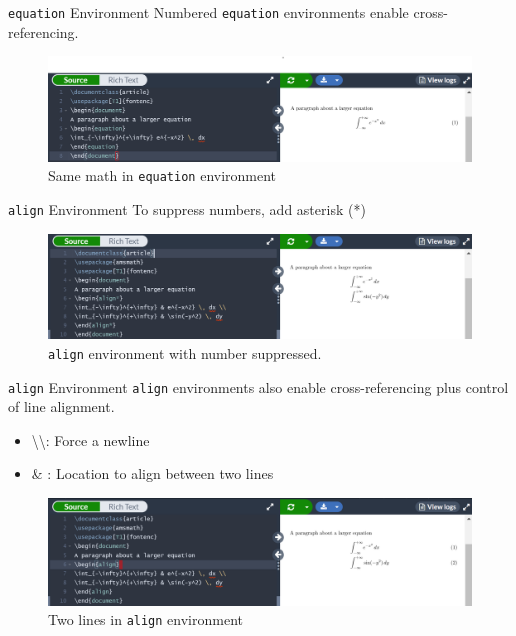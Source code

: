 \documentclass{beamer}
\begin{document}
{  \begin{frame}{\texttt{equation} Environment}
    Numbered \texttt{equation} environments enable cross-referencing.
    \begin{figure}
      \includegraphics[width=1.0\linewidth]{day02-01E-numbered.png}
      \caption{Same math in \texttt{equation} environment}
      \label{fig:day02-01E}
    \end{figure}
  \end{frame}

  \begin{frame}{\texttt{align} Environment}
    To suppress numbers, add asterisk (*) 
    \begin{figure}
      \includegraphics[width=1.0\linewidth]{day02-01G-asterisk.png}
      \caption{\texttt{align} environment with number suppressed.}
      \label{fig:day02-01G}
    \end{figure}
  \end{frame}

  \begin{frame}{\texttt{align} Environment}
    \texttt{align} environments also enable cross-referencing plus control of line alignment.
    \begin{itemize}
      \item \textbackslash\textbackslash : Force a newline
      \item \& : Location to align between two lines
    \end{itemize}
    \begin{figure}
      \includegraphics[width=1.0\linewidth]{day02-01F-align.png}
      \caption{Two lines in \texttt{align} environment}
      \label{fig:day02-01F}
    \end{figure}
  \end{frame}

}
\end{document}
